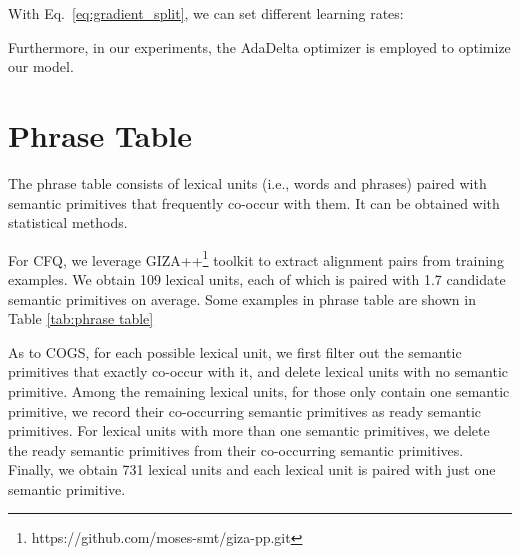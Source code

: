 \documentclass[11pt,a4paper]{article}
\begin{document}
With Eq.~\ref{eq:gradient_split}, we can set different learning rates:

Furthermore, in our experiments, the AdaDelta optimizer \cite{adadelta_2012-apd} is employed to optimize our model.

\section{Phrase Table}

\begin{table*}[t]
    \renewcommand\arraystretch{1.2}
    \centering
    \caption{Some examples in CFQ phrase table.}
    \label{tab:phrase table}
\end{table*}

The phrase table consists of lexical units (i.e., words and phrases) paired with semantic primitives that frequently co-occur with them.
It can be obtained with statistical methods.

For CFQ, we leverage GIZA++\footnote{https://github.com/moses-smt/giza-pp.git} \cite{och2003systematic-apd} toolkit to extract alignment pairs from training examples.
We obtain 109 lexical units, each of which is paired with 1.7 candidate semantic primitives on average.
Some examples in phrase table are shown in Table \ref{tab:phrase table}

As to COGS, for each possible lexical unit, we first filter out the semantic primitives that exactly co-occur with it, and delete lexical units with no semantic primitive.
Among the remaining lexical units, for those only contain one semantic primitive, we record their co-occurring semantic primitives as ready semantic primitives.
For lexical units with more than one semantic primitives, we delete the ready semantic primitives from their co-occurring semantic primitives.
Finally, we obtain 731 lexical units and each lexical unit is paired with just one semantic primitive.
\end{document}
